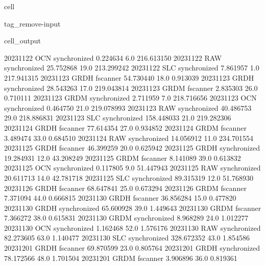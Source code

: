 \documentclass[letterpaper,10pt,english]{jupyterBook}
\begin{document}
\begin{sphinxuseclass}{cell}
\begin{sphinxuseclass}{tag_remove-input}
\begin{sphinxVerbatimOutput}
\begin{sphinxuseclass}{cell_output}
\begin{sphinxVerbatim}[commandchars=\\\{\}]
2023\PYGZhy{}11\PYGZhy{}22          OCN  synchronized    0.224634     6.0  216.613150
2023\PYGZhy{}11\PYGZhy{}22          RAW  synchronized   25.752868    19.0  213.299242
2023\PYGZhy{}11\PYGZhy{}22          SLC  synchronized    7.861957     1.0  217.941315
2023\PYGZhy{}11\PYGZhy{}23         GRDH      fscanner   54.730440    18.0    0.913039
2023\PYGZhy{}11\PYGZhy{}23         GRDH  synchronized   28.543263    17.0  219.043814
2023\PYGZhy{}11\PYGZhy{}23         GRDM      fscanner    2.835303    26.0    0.710111
2023\PYGZhy{}11\PYGZhy{}23         GRDM  synchronized    2.711959     7.0  218.716656
2023\PYGZhy{}11\PYGZhy{}23          OCN  synchronized    0.464750    21.0  219.078993
2023\PYGZhy{}11\PYGZhy{}23          RAW  synchronized   40.486753    29.0  218.886831
2023\PYGZhy{}11\PYGZhy{}23          SLC  synchronized  158.448033    21.0  219.282306
2023\PYGZhy{}11\PYGZhy{}24         GRDH      fscanner   77.614354    27.0    0.934852
2023\PYGZhy{}11\PYGZhy{}24         GRDM      fscanner    3.489474    33.0    0.684510
2023\PYGZhy{}11\PYGZhy{}24          RAW  synchronized   14.056912    11.0  234.701554
2023\PYGZhy{}11\PYGZhy{}25         GRDH      fscanner   46.399259    20.0    0.625942
2023\PYGZhy{}11\PYGZhy{}25         GRDH  synchronized   19.284931    12.0   43.208249
2023\PYGZhy{}11\PYGZhy{}25         GRDM      fscanner    8.141089    39.0    0.613832
2023\PYGZhy{}11\PYGZhy{}25          OCN  synchronized    0.117805     9.0   51.447943
2023\PYGZhy{}11\PYGZhy{}25          RAW  synchronized   20.611713    14.0   42.781718
2023\PYGZhy{}11\PYGZhy{}25          SLC  synchronized   89.315319    12.0   51.768930
2023\PYGZhy{}11\PYGZhy{}26         GRDH      fscanner   68.647841    25.0    0.673294
2023\PYGZhy{}11\PYGZhy{}26         GRDM      fscanner    7.371094    44.0    0.666815
2023\PYGZhy{}11\PYGZhy{}30         GRDH      fscanner   36.856284    15.0    0.477820
2023\PYGZhy{}11\PYGZhy{}30         GRDH  synchronized   65.600928    39.0    1.449643
2023\PYGZhy{}11\PYGZhy{}30         GRDM      fscanner    7.366272    38.0    0.615831
2023\PYGZhy{}11\PYGZhy{}30         GRDM  synchronized    8.968289    24.0    1.012277
2023\PYGZhy{}11\PYGZhy{}30          OCN  synchronized    1.162468    52.0    1.576176
2023\PYGZhy{}11\PYGZhy{}30          RAW  synchronized   82.273605    63.0    1.140477
2023\PYGZhy{}11\PYGZhy{}30          SLC  synchronized  328.672352    43.0    1.854586
2023\PYGZhy{}12\PYGZhy{}01         GRDH      fscanner   69.870599    23.0    0.805764
2023\PYGZhy{}12\PYGZhy{}01         GRDH  synchronized   78.172566    48.0    1.701504
2023\PYGZhy{}12\PYGZhy{}01         GRDM      fscanner    3.906896    36.0    0.819361

\end{sphinxVerbatim}
\end{sphinxuseclass}
\end{sphinxVerbatimOutput}
\end{sphinxuseclass}
\end{sphinxuseclass}
\end{document}
